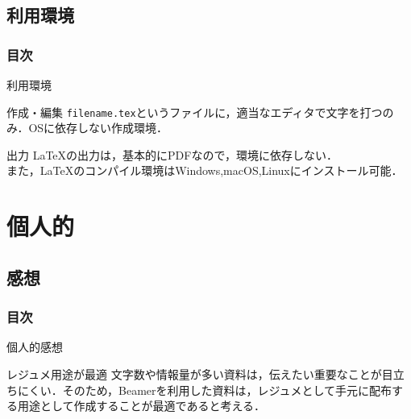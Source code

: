 \documentclass[dvipdfmx]{beamer}
\begin{document}
\subsection{利用環境}
\begin{frame}
    \frametitle{目次}
    \tableofcontents[currentsection,sectionstyle=show/shaded,subsectionstyle=show/shaded]
\end{frame}

\begin{frame}[fragile]{利用環境}
    \begin{block}{作成・編集}
        \verb|filename.tex|というファイルに，適当なエディタで文字を打つのみ．OSに依存しない作成環境．
    \end{block}
    \begin{block}{出力}
        \LaTeX の出力は，基本的にPDFなので，環境に依存しない．\\
        また，\LaTeX のコンパイル環境はWindows,macOS,Linuxにインストール可能．
    \end{block}
\end{frame}

\section{個人的}
\subsection{感想}
\begin{frame}
    \frametitle{目次}
    \tableofcontents[currentsection,sectionstyle=show/shaded,subsectionstyle=show/shaded]
\end{frame}

\begin{frame}{個人的感想}
    \begin{block}{レジュメ用途が最適}
        文字数や情報量が多い資料は，伝えたい重要なことが目立ちにくい．そのため，Beamerを利用した資料は，レジュメとして手元に配布する用途として作成することが最適であると考える．\\
    \end{block}
\end{frame}
\end{document}
